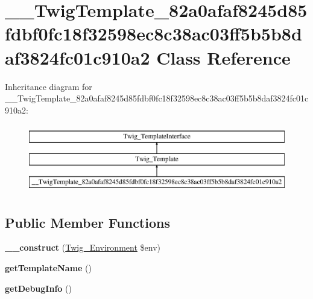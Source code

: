 \hypertarget{class_____twig_template__82a0afaf8245d85fdbf0fc18f32598ec8c38ac03ff5b5b8daf3824fc01c910a2}{}\section{\+\_\+\+\_\+\+Twig\+Template\+\_\+82a0afaf8245d85fdbf0fc18f32598ec8c38ac03ff5b5b8daf3824fc01c910a2 Class Reference}
\label{class_____twig_template__82a0afaf8245d85fdbf0fc18f32598ec8c38ac03ff5b5b8daf3824fc01c910a2}
Inheritance diagram for \+\_\+\+\_\+\+Twig\+Template\+\_\+82a0afaf8245d85fdbf0fc18f32598ec8c38ac03ff5b5b8daf3824fc01c910a2\+:\begin{figure}[H]
\begin{center}
\leavevmode
\includegraphics[height=3.000000cm]{class_____twig_template__82a0afaf8245d85fdbf0fc18f32598ec8c38ac03ff5b5b8daf3824fc01c910a2}
\end{center}
\end{figure}
\subsection*{Public Member Functions}
\begin{DoxyCompactItemize}
\item 
\hypertarget{class_____twig_template__82a0afaf8245d85fdbf0fc18f32598ec8c38ac03ff5b5b8daf3824fc01c910a2_a4f8326243132c1450a81e0a817aa1be7}{}{\bfseries \+\_\+\+\_\+construct} (\hyperlink{class_twig___environment}{Twig\+\_\+\+Environment} \$env)\label{class_____twig_template__82a0afaf8245d85fdbf0fc18f32598ec8c38ac03ff5b5b8daf3824fc01c910a2_a4f8326243132c1450a81e0a817aa1be7}

\item 
\hypertarget{class_____twig_template__82a0afaf8245d85fdbf0fc18f32598ec8c38ac03ff5b5b8daf3824fc01c910a2_a621a3ccd148ed8b9e937da6959c98f39}{}{\bfseries get\+Template\+Name} ()\label{class_____twig_template__82a0afaf8245d85fdbf0fc18f32598ec8c38ac03ff5b5b8daf3824fc01c910a2_a621a3ccd148ed8b9e937da6959c98f39}

\item 
\hypertarget{class_____twig_template__82a0afaf8245d85fdbf0fc18f32598ec8c38ac03ff5b5b8daf3824fc01c910a2_abd0ecb0136f4228db2bd963bfc1e20d7}{}{\bfseries get\+Debug\+Info} ()\label{class_____twig_template__82a0afaf8245d85fdbf0fc18f32598ec8c38ac03ff5b5b8daf3824fc01c910a2_abd0ecb0136f4228db2bd963bfc1e20d7}

\end{DoxyCompactItemize}
